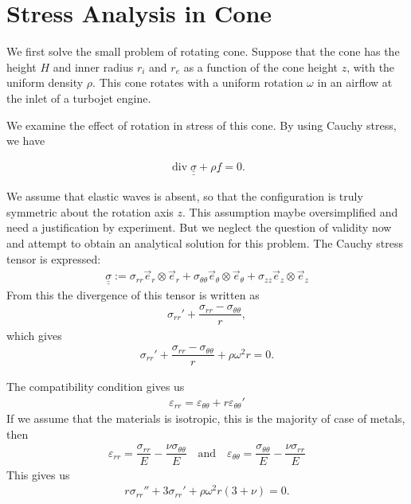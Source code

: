 \documentclass[a4paper,12pt]{book}
\DeclareMathOperator{\Div}{div}
\begin{document}
\section*{Stress Analysis in Cone} %
\label{sec:Stress_Analysis_in_Cone}

We first solve the small problem of rotating cone. Suppose that the cone has the height $H$ and inner radius $r_i$ and $r_e$ as a function of the cone height $z$, with the uniform density $\rho$. This cone rotates with a uniform rotation $\omega$ in an airflow at the inlet of a turbojet engine.

We examine the effect of rotation in stress of this cone. By using Cauchy stress, we have

\begin{align}
    \Div \underline{\underline{\sigma}} + \rho \underline{f} = 0.
\end{align}

We assume that elastic waves is absent, so that the configuration is truly symmetric about the rotation axis $z$. This assumption maybe oversimplified and need a justification by experiment. But we neglect the question of validity now and attempt to obtain an analytical solution for this problem. The Cauchy stress tensor is expressed:
\begin{align}
    \underline{\underline{\sigma}} := \sigma_{rr}\vec{e}_r \otimes \vec{e}_r + \sigma_{\theta \theta}\vec{e}_\theta \otimes \vec{e}_\theta + \sigma_{z z}\vec{e}_z \otimes \vec{e}_z
\end{align}
From this the divergence of this tensor is written as
\begin{align*}
    \sigma_{rr}' + \dfrac{\sigma_{rr} - \sigma_{\theta \theta}}{r},
\end{align*}
which gives
\begin{align}
    \sigma_{rr}' + \dfrac{\sigma_{rr} - \sigma_{\theta \theta}}{r} + \rho \omega^2 r = 0.
\end{align}

The compatibility condition gives us
\begin{align}
    \varepsilon_{rr} = \varepsilon_{\theta \theta} + r\varepsilon_{\theta \theta}'
\end{align}
If we assume that the materials is isotropic, this is the majority of case of metals, then
\begin{align}
    \varepsilon_{rr} = \dfrac{\sigma_{rr}}{E} - \dfrac{\nu \sigma_{\theta\theta}}{E}
    \quad\text{and}\quad
    \varepsilon_{\theta\theta} = \dfrac{\sigma_{\theta \theta}}{E} - \dfrac{\nu \sigma_{rr}}{E}
\end{align}
This gives us
\begin{align}
    r\sigma_{rr}'' + 3\sigma_{rr}' + \rho \omega^2 r (3 + \nu) = 0.
\end{align}
\end{document}
